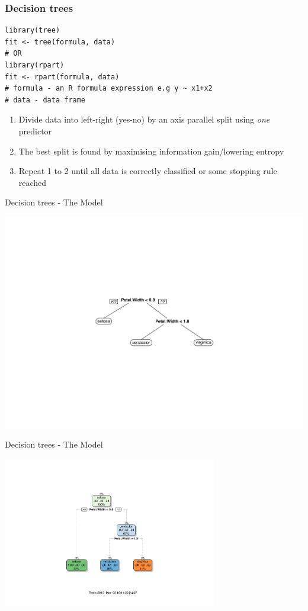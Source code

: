 \documentclass[pdf]{beamer}
\begin{document}
\begin{frame}[fragile]
\frametitle{Decision trees}
\begin{lstlisting}[style=RCode]
library(tree)
fit <- tree(formula, data)
# OR
library(rpart)
fit <- rpart(formula, data)
# formula - an R formula expression e.g y ~ x1+x2
# data - data frame
\end{lstlisting}
\begin{enumerate}\addtolength{\itemsep}{0.5\baselineskip}
	\item<2-> Divide data into left-right (yes-no) by an axis parallel split using \textit{one} predictor 
	\item<3-> The best split is found by maximising information gain/lowering entropy
	\item<4-> Repeat 1 to 2 until all data is correctly classified or some stopping rule reached
\end{enumerate}
\end{frame}
\begin{frame}{Decision trees - The Model}
\begin{center}
	\includegraphics[width=\textwidth]{crudeTree.pdf}
\end{center}
\end{frame}
\begin{frame}{Decision trees - The Model}
\begin{center}
	\includegraphics[width=0.7\textwidth]{niceTree.pdf}	
\end{center}
\end{frame}
\end{document}
